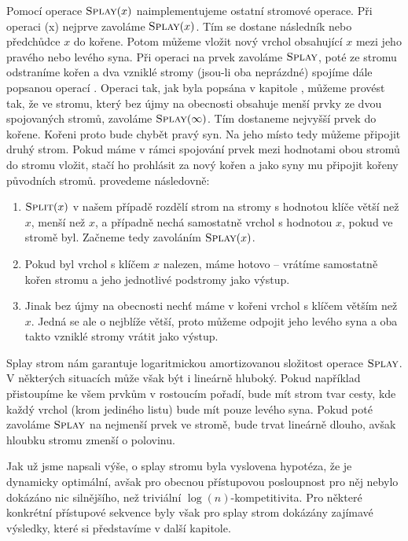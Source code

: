 Pomocí operace $\ope{Splay}(x)$ naimplementujeme ostatní stromové operace. Při operaci (x) nejprve zavoláme $\ope{Splay}(x)$. Tím se dostane následník nebo předchůdce $x$ do kořene. Potom můžeme vložit nový vrchol obsahující $x$ mezi jeho pravého nebo levého syna. Při operaci  na prvek zavoláme $\ope{Splay}$, poté ze stromu odstraníme kořen a dva vzniklé stromy (jsou-li oba neprázdné)  spojíme dále popsanou operací . Operaci  tak, jak byla popsána v kapitole , můžeme provést tak, že ve stromu, který bez újmy na obecnosti obsahuje menší prvky ze dvou spojovaných stromů, zavoláme $\ope{Splay}(\infty)$. Tím dostaneme nejvyšší prvek do kořene. Kořeni proto bude chybět pravý syn. Na jeho místo tedy můžeme připojit druhý strom. Pokud máme v rámci spojování prvek mezi hodnotami obou stromů do stromu vložit, stačí ho prohlásit za nový kořen a jako syny mu připojit kořeny původních stromů.  provedeme následovně:

\begin{enumerate}
\item $\ope{Split}(x)$ v našem případě rozdělí strom na stromy s hodnotou klíče větší než $x$, menší než $x$, a případně nechá samostatně vrchol s hodnotou $x$, pokud ve stromě byl. Začneme tedy zavoláním $\ope{Splay}(x)$.
\item Pokud byl vrchol s klíčem $x$ nalezen, máme hotovo -- vrátíme samostatně kořen stromu a jeho jednotlivé podstromy jako výstup.
\item Jinak bez újmy na obecnosti nechť máme v kořeni vrchol s klíčem větším než $x$. Jedná se ale o nejblíže větší, proto můžeme odpojit jeho levého syna a oba takto vzniklé stromy vrátit jako výstup.
\end{enumerate}

Splay strom nám garantuje logaritmickou amortizovanou složitost operace $\ope{Splay}$. V některých situacích může však být i lineárně hluboký. Pokud například přistoupíme ke všem prvkům v rostoucím pořadí, bude mít strom tvar cesty, kde každý vrchol (krom jediného listu) bude mít pouze levého syna. Pokud poté zavoláme $\ope{Splay}$ na nejmenší prvek ve stromě, bude trvat lineárně dlouho, avšak hloubku stromu zmenší o polovinu.

Jak už jsme napsali výše, o splay stromu byla vyslovena hypotéza, že je dynamicky optimální, avšak pro obecnou přístupovou posloupnost pro něj nebylo dokázáno nic silnějšího, než triviální $\log(n)$-kompetitivita. Pro některé konkrétní přístupové sekvence byly však pro splay strom dokázány zajímavé výsledky, které si představíme v další kapitole.

